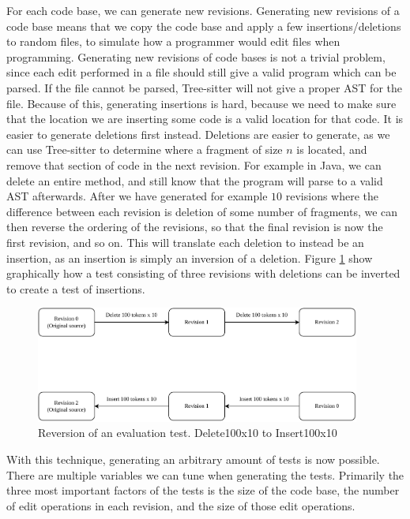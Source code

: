 For each code base, we can generate new revisions. Generating new revisions of a code base
means that we copy the code base and apply a few insertions/deletions to random files, to
simulate how a programmer would edit files when programming. Generating new revisions of
code bases is not a trivial problem, since each edit performed in a file should still give
a valid program which can be parsed. If the file cannot be parsed, Tree-sitter will not
give a proper AST for the file. Because of this, generating insertions is hard, because we
need to make sure that the location we are inserting some code is a valid location for
that code. It is easier to generate deletions first instead. Deletions are easier to
generate, as we can use Tree-sitter to determine where a fragment of size $n$ is located,
and remove that section of code in the next revision. For example in Java, we can delete
an entire method, and still know that the program will parse to a valid AST afterwards.
After we have generated for example $10$ revisions where the difference between each
revision is deletion of some number of fragments, we can then reverse the ordering of the
revisions, so that the final revision is now the first revision, and so on. This will
translate each deletion to instead be an insertion, as an insertion is simply an inversion
of a deletion. Figure \ref{fig:revisioninversion} show graphically how a test consisting
of three revisions with deletions can be inverted to create a test of insertions.

\begin{figure}[t]
    \begin{center}
        \includegraphics[width=0.95\textwidth]{figures/revisioninversion.drawio.pdf}
    \end{center}
    \caption{Reversion of an evaluation test. Delete100x10 to Insert100x10}
    \label{fig:revisioninversion}
\end{figure}

With this technique, generating an arbitrary amount of tests is now possible. There are
multiple variables we can tune when generating the tests. Primarily the three most
important factors of the tests is the size of the code base, the number of edit operations
in each revision, and the size of those edit operations.

